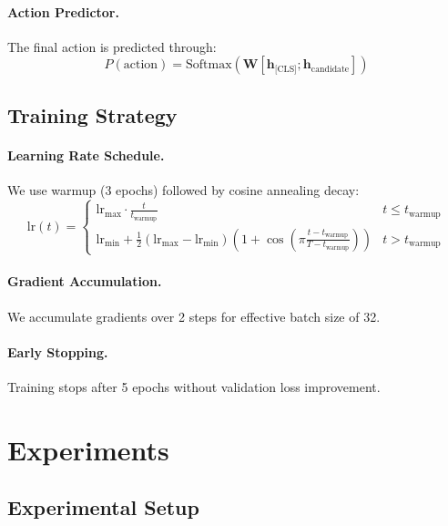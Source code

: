 \documentclass[11pt,a4paper]{article}
\begin{document}
\paragraph{Action Predictor.} The final action is predicted through:
\begin{equation}
P(\text{action}) = \text{Softmax}(\mathbf{W}[\mathbf{h}_{\text{[CLS]}}; \mathbf{h}_{\text{candidate}}])
\end{equation}

\subsection{Training Strategy}

\paragraph{Learning Rate Schedule.} We use warmup (3 epochs) followed by cosine annealing decay:
\begin{equation}
\text{lr}(t) = \begin{cases}
\text{lr}_{\max} \cdot \frac{t}{t_{\text{warmup}}} & t \leq t_{\text{warmup}} \\
\text{lr}_{\min} + \frac{1}{2}(\text{lr}_{\max} - \text{lr}_{\min})(1 + \cos(\pi \frac{t - t_{\text{warmup}}}{T - t_{\text{warmup}}})) & t > t_{\text{warmup}}
\end{cases}
\end{equation}

\paragraph{Gradient Accumulation.} We accumulate gradients over 2 steps for effective batch size of 32.

\paragraph{Early Stopping.} Training stops after 5 epochs without validation loss improvement.

\section{Experiments}

\subsection{Experimental Setup}
\end{document}

